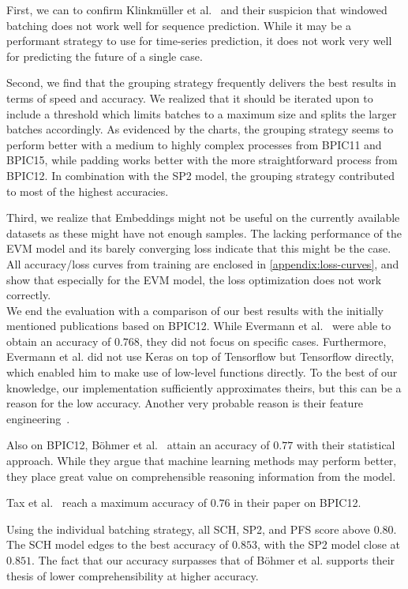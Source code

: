 First, we can to confirm Klinkmüller et al.~\cite{klinkmuller2018reliablemonitoring} and their suspicion that windowed batching does not work well for sequence prediction. While it may be a performant strategy to use for time-series prediction, it does not work very well for predicting the future of a single case.

Second, we find that the grouping strategy frequently delivers the best results in terms of speed and accuracy. We realized that it should be iterated upon to include a threshold which limits batches to a maximum size and splits the larger batches accordingly. As evidenced by the charts, the grouping strategy seems to perform better with a medium to highly complex processes from BPIC11 and BPIC15, while padding works better with the more straightforward process from BPIC12. In combination with the SP2 model, the grouping strategy contributed to most of the highest accuracies.

Third, we realize that Embeddings might not be useful on the currently available datasets as these might have not enough samples. The lacking performance of the EVM model and its barely converging loss indicate that this might be the case. All accuracy/loss curves from training are enclosed in \autoref{appendix:loss-curves}, and show that especially for the EVM model, the loss optimization does not work correctly.\\

We end the evaluation with a comparison of our best results with the initially mentioned publications based on BPIC12. While Evermann et al.~\cite{evermann2016} were able to obtain an accuracy of $0.768$, they did not focus on specific cases. Furthermore, Evermann et al. did not use Keras on top of Tensorflow but Tensorflow directly, which enabled him to make use of low-level functions directly. To the best of our knowledge, our implementation sufficiently approximates theirs, but this can be a reason for the low accuracy. Another very probable reason is their feature engineering~\cite{evermann2016}.

Also on BPIC12, Böhmer et al.~\cite{boehmer2018probability} attain an accuracy of $0.77$ with their statistical approach. While they argue that machine learning methods may perform better, they place great value on comprehensible reasoning information from the model.

Tax et al.~\cite{tax2017} reach a maximum accuracy of $0.76$ in their paper on BPIC12.

Using the individual batching strategy, all SCH, SP2, and PFS score above $0.80$.
The SCH model edges to the best accuracy of $0.853$, with the SP2 model close at $0.851$.
The fact that our accuracy surpasses that of Böhmer et al. supports their thesis of lower comprehensibility at higher accuracy.\\

